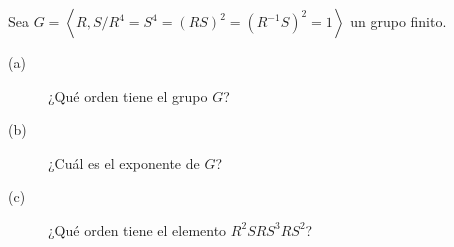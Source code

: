 \documentclass{article}
\begin{document}
\begin{ej}
Sea $\displaystyle G = \left\langle R, S/R^{4}=S^{4}=\left(RS\right)^{2} = \left(R^{-1}S\right)^{2} = 1 \right\rangle  $ un grupo finito.
\begin{description}
\item[(a)] ¿Qué orden tiene el grupo $\displaystyle G $?
\item[(b)] ¿Cuál es el exponente de $\displaystyle G $?
\item[(c)] ¿Qué orden tiene el elemento $\displaystyle R^{2}SRS^{3}RS^{2} $?
\end{description}
\end{ej}
\end{document}
